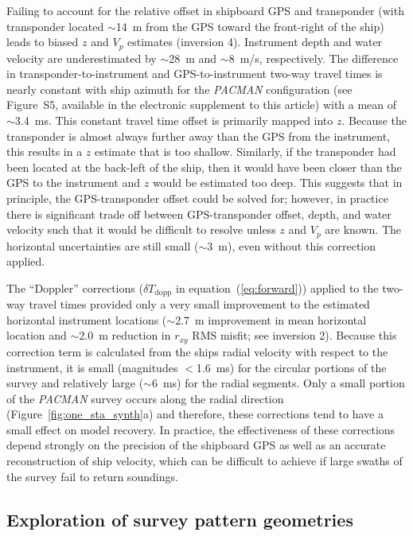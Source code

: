 Failing to account for the relative offset in shipboard GPS and transponder (with transponder located $\sim$14~m from the GPS toward the front-right of the ship) leads to biased $z$ and $V_p$ estimates (inversion 4). Instrument depth and water velocity are underestimated by $\sim$28~m and $\sim$8~m/s, respectively. The difference in transponder-to-instrument and GPS-to-instrument two-way travel times is nearly constant with ship azimuth for the \textit{PACMAN} configuration (see Figure~S5, available in the electronic supplement to this article) with a mean of $\sim$3.4~ms. This constant travel time offset is primarily mapped into $z$. Because the transponder is almost always further away than the GPS from the instrument, this results in a $z$ estimate that is too shallow. Similarly, if the transponder had been located at the back-left of the ship, then it would have been closer than the GPS to the instrument and $z$ would be estimated too deep. This suggests that in principle, the GPS-transponder offset could be solved for; however, in practice there is significant trade off between GPS-transponder offset, depth, and water velocity such that it would be difficult to resolve unless $z$ and $V_p$ are known. The horizontal uncertainties are still small ($\sim$3~m), even without this correction applied.

The ``Doppler'' corrections ($\delta T_{\text{dopp}}$ in equation~(\ref{eq:forward})) applied to the two-way travel times provided only a very small improvement to the estimated horizontal instrument locations ($\sim$2.7~m improvement in mean horizontal location and $\sim$2.0~m reduction in $r_{xy}$ RMS misfit; see inversion 2). Because this correction term is calculated from the ships radial velocity with respect to the instrument, it is small (magnitudes $<$1.6~ms) for the circular portions of the survey and relatively large ($\sim$6~ms) for the radial segments. Only a small portion of the \textit{PACMAN} survey occurs along the radial direction (Figure~\ref{fig:one_sta_synth}a) and therefore, these corrections tend to have a small effect on model recovery. In practice, the effectiveness of these corrections depend strongly on the precision of the shipboard GPS as well as an accurate reconstruction of ship velocity, which can be difficult to achieve if large swaths of the survey fail to return soundings.


\subsection{Exploration of survey pattern geometries} \label{sec:surv_geom_tests}

